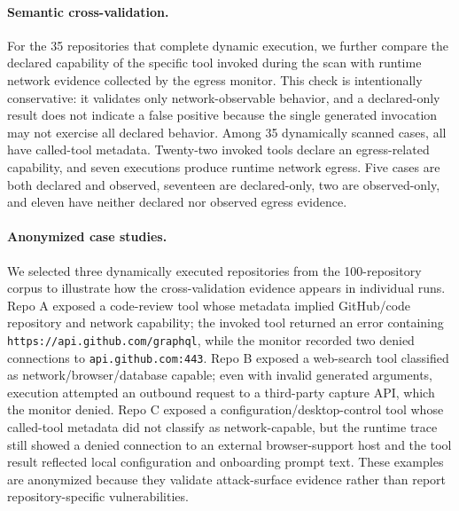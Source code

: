 \paragraph{Semantic cross-validation.}
For the 35 repositories that complete dynamic execution, we further compare
the declared capability of the specific tool invoked during the scan with
runtime network evidence collected by the egress monitor. This check is
intentionally conservative: it validates only network-observable behavior,
and a declared-only result does not indicate a false positive because the
single generated invocation may not exercise all declared behavior. Among
35 dynamically scanned cases, all have called-tool metadata. Twenty-two
invoked tools declare an egress-related capability, and seven executions
produce runtime network egress. Five cases are both declared and observed,
seventeen are declared-only, two are observed-only, and eleven have neither
declared nor observed egress evidence.

\paragraph{Anonymized case studies.}
We selected three dynamically executed repositories from the 100-repository
corpus to illustrate how the cross-validation evidence appears in individual
runs. Repo A exposed a code-review tool whose metadata implied GitHub/code
repository and network capability; the invoked tool returned an error containing
\texttt{https://api.github.com/graphql}, while the monitor recorded two denied
connections to \texttt{api.github.com:443}. Repo B exposed a web-search tool
classified as network/browser/database capable; even with invalid generated
arguments, execution attempted an outbound request to a third-party capture API,
which the monitor denied. Repo C exposed a configuration/desktop-control tool
whose called-tool metadata did not classify as network-capable, but the runtime
trace still showed a denied connection to an external browser-support host and
the tool result reflected local configuration and onboarding prompt text. These
examples are anonymized because they validate attack-surface evidence rather
than report repository-specific vulnerabilities.
